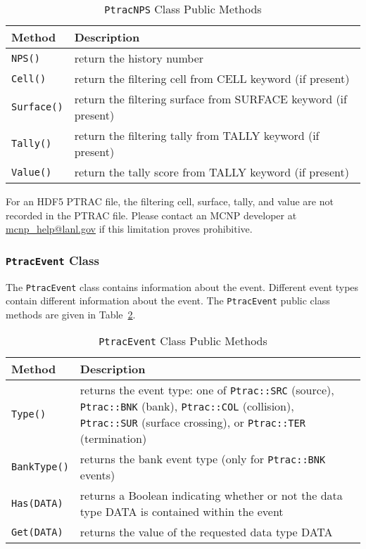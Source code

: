 \documentclass[11pt]{article}
\begin{document}
\begin{table}[]
  \begin{center}
  \caption{\texttt{PtracNPS} Class Public Methods}
  \label{tab:ptracnps_class_public_methods}
    \begin{tabular}{lp{4.0in}}
      \toprule
        Method & Description \\
      \midrule
        \texttt{NPS()}     & return the history number \\
        \texttt{Cell()}    & return the filtering cell from CELL keyword (if present) \\
        \texttt{Surface()} & return the filtering surface from SURFACE keyword (if present) \\
        \texttt{Tally()}   & return the filtering tally from TALLY keyword (if present) \\
        \texttt{Value()}   & return the tally score from TALLY keyword (if present)  \\
      \bottomrule
    \end{tabular}
  \end{center}
\end{table}

For an HDF5 PTRAC file, the filtering cell, surface, tally, and value are not
recorded in the PTRAC file.  Please contact an MCNP developer at
\href{mailto:mcnp\_help@lanl.gov}{mcnp\_help@lanl.gov} if this limitation
proves prohibitive.

\subsubsection{\texttt{PtracEvent} Class}\label{the-ptracevent-class}

The \texttt{PtracEvent} class contains information about the event.
Different event types contain different information about the event. The
\texttt{PtracEvent} public class methods are given in
Table~\ref{tab:ptracevent_class_public_methods}.

\begin{table}[]
  \begin{center}
  \caption{\texttt{PtracEvent} Class Public Methods}
  \label{tab:ptracevent_class_public_methods}
    \begin{tabular}{lp{4.0in}}
      \toprule
        Method & Description \\
      \midrule
        \texttt{Type()}     & returns the event type: one of \texttt{Ptrac::SRC} (source), \texttt{Ptrac::BNK} (bank), \texttt{Ptrac::COL} (collision), \texttt{Ptrac::SUR} (surface crossing), or \texttt{Ptrac::TER} (termination) \\
        \texttt{BankType()} & returns the bank event type (only for \texttt{Ptrac::BNK} events) \\
        \texttt{Has(DATA)}  & returns a Boolean indicating whether or not the data type DATA is contained within the event \\
        \texttt{Get(DATA)}  & returns the value of the requested data type DATA  \\
      \bottomrule
    \end{tabular}
  \end{center}
\end{table}
\end{document}
